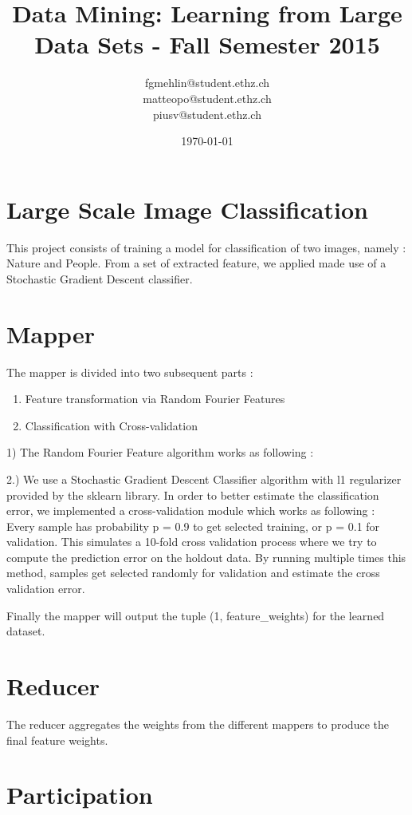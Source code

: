 \documentclass[a4paper, 11pt]{article}
\title{Data Mining: Learning from Large Data Sets - Fall Semester 2015}
\author{fgmehlin@student.ethz.ch\\ matteopo@student.ethz.ch\\ piusv@student.ethz.ch\\}
\date{\today}
\begin{document}
\maketitle

\section*{Large Scale Image Classification} 
This project consists of training a model for classification of two images, namely : Nature and People. From a set of extracted feature, we applied made use of a Stochastic Gradient Descent classifier.
\section{Mapper}

The mapper is divided into two subsequent parts :
\begin{enumerate}
\item Feature transformation via Random Fourier Features
\item Classification with Cross-validation
\end{enumerate}


1) The Random Fourier Feature algorithm works as following :


2.) We use a Stochastic Gradient Descent Classifier algorithm with l1 regularizer provided by the sklearn library. In order to better estimate the classification error, we implemented a cross-validation module which works as following : \\

Every sample has probability p = 0.9 to get selected training, or p = 0.1 for validation. This simulates a 10-fold cross validation process where we try to compute the prediction error on the holdout data. By running multiple times this method, samples get selected randomly for validation and estimate the cross validation error.

Finally the mapper will output the tuple (1, feature\_weights) for the learned dataset.

\section{Reducer}

The reducer aggregates the weights from the different mappers to produce the final feature weights.

\section{Participation}
\end{document}
